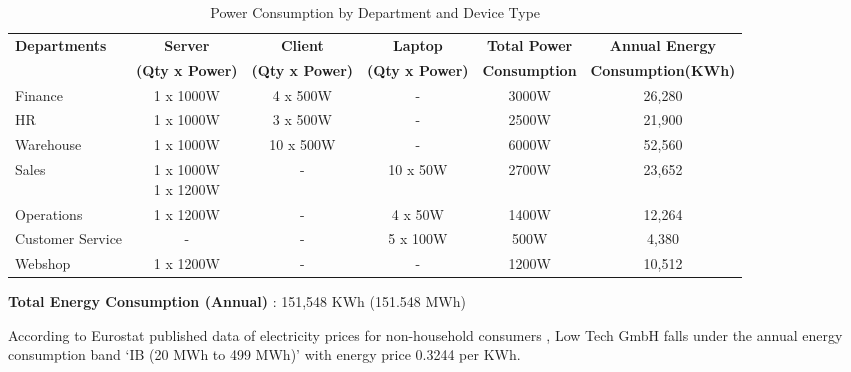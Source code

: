 \documentclass{llncs}
\begin{document}
\begin{table}[htbp]
  \centering
  \begin{tabular}{|l|c|c|c|c|c|}
    \hline
    \textbf{Departments} & \textbf{Server}          & \textbf{Client}          & \textbf{Laptop}          & \textbf{Total Power}   & \textbf{Annual Energy}      \\
                         & \textbf{ (Qty x Power) } & \textbf{ (Qty x Power) } & \textbf{ (Qty x Power) } & \textbf{ Consumption } & \textbf{ Consumption(KWh) } \\
    \hline
    Finance              & 1 x 1000W                & 4 x 500W                 & -                        & 3000W                  & 26,280                      \\
    \hline
    HR                   & 1 x 1000W                & 3 x 500W                 & -                        & 2500W                  & 21,900                      \\
    \hline
    Warehouse            & 1 x 1000W                & 10 x 500W                & -                        & 6000W                  & 52,560                      \\
    \hline
    Sales                & \makecell{1 x 1000W                                                                                                                   \\ 1 x 1200W} & - & 10 x 50W & 2700W & 23,652 \\
    \hline
    Operations           & 1 x 1200W                & -                        & 4 x 50W                  & 1400W                  & 12,264                      \\
    \hline
    Customer Service     & -                        & -                        & 5 x 100W                 & 500W                   & 4,380                       \\
    \hline
    Webshop              & 1 x 1200W                & -                        & -                        & 1200W                  & 10,512                      \\
    \hline
  \end{tabular}
  \caption{Power Consumption by Department and Device Type}
  \label{tab:power_consumption}
\end{table}

\textbf{Total Energy Consumption (Annual)} : 151,548 KWh (151.548 MWh)

According to Eurostat published data of electricity prices for non-household consumers \cite{eurostat2023}, Low Tech GmbH falls under the annual energy consumption band 
`IB (20 MWh to 499 MWh)' with energy price 0.3244 \EUR{} per KWh.
\end{document}
